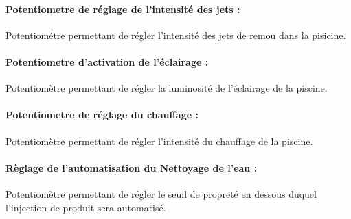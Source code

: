 \documentclass[a4paper,11pt]{article}
\begin{document}
    \paragraph{Potentiometre de réglage de l'intensité des jets :}
        Potentiométre permettant de régler l'intensité des jets de remou dans la pisicine.

    \paragraph{Potentiometre d'activation de l'éclairage :}
        Potentiomètre permettant de régler la luminosité de l'éclairage de la piscine.	

    \paragraph{Potentiometre de réglage du chauffage :}
        Potentiomètre permettant de régler l'intensité du chauffage de la piscine.

    \paragraph{Règlage de l'automatisation du Nettoyage de l'eau :}
	    Potentiomètre permettant de régler le seuil de propreté en dessous duquel l'injection de produit sera automatisé.
\end{document}
